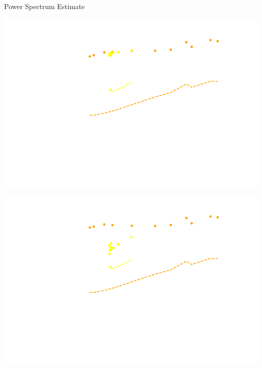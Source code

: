 \documentclass{beamer}
\begin{document}
\begin{frame}{Power Spectrum Estimate}
    \begin{overprint}
        \begin{center}
            \includegraphics[height=0.75\textheight]{figures/spherical-power-spectra/spherical-power-spectrum-filter-strength-2.pdf}
        \end{center}
        \begin{center}
            \includegraphics[height=0.75\textheight]{figures/spherical-power-spectra/spherical-power-spectrum-filter-strength-1.pdf}
        \end{center}
    \end{overprint}
\end{frame}
\end{document}
